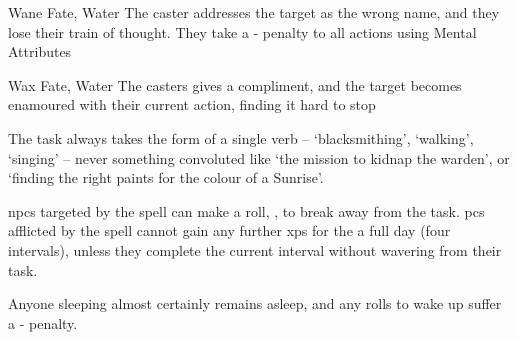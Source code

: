 \ifodd\value{diceNo}

  {}%
  {Wane}%
  {Fate, Water}%
  {}%
  {The caster addresses the target as the wrong name, and they lose their train of thought.
    They take a - penalty to all actions using Mental Attributes}%
  {}

\else

  {}%
  {Wax}%
  {Fate, Water}%
  {}%
  {The casters gives a compliment, and the target becomes enamoured with their current action, finding it hard to stop}%
  {
    The task always takes the form of a single verb -- `blacksmithing', `walking', `singing' -- never something convoluted like `the mission to kidnap the warden', or `finding the right paints for the colour of a Sunrise'.

    \Glspl{npc} targeted by the spell can make a  roll, \tn[8], to break away from the task.
    \Glspl{pc} afflicted by the spell cannot gain any further \glspl{xp} for the a full day (four \glspl{interval}), unless they complete the current \gls{interval} without wavering from their task.

  Anyone sleeping almost certainly remains asleep, and any rolls to wake up suffer a - penalty.}

\fi
{}
